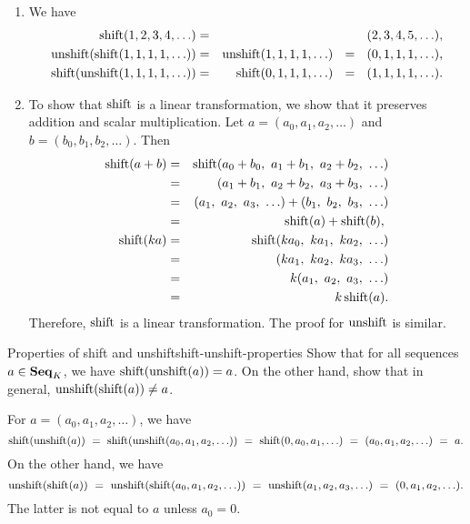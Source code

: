 \begin{solution}
  \begin{enumialphparenastyle}
    \begin{enumerate}
    \item We have
      \begin{eqnarray*}
        \shift(1,2,3,4,\ldots)
        &=& (2,3,4,5,\ldots), \\
        \unshift(\shift(1,1,1,1,\ldots))
        &=& \unshift(1,1,1,1,\ldots)
        ~~=~~ (0,1,1,1,\ldots), \\
        \shift(\unshift(1,1,1,1,\ldots))
        &=& \shift(0,1,1,1,\ldots)
        ~~=~~ (1,1,1,1,\ldots).
      \end{eqnarray*}
    \item To show that $\shift$ is a linear transformation, we show
      that it preserves addition and scalar multiplication. Let
      $a=(a_0,a_1,a_2,\ldots)$ and $b=(b_0,b_1,b_2,\ldots)$. Then
      \begin{eqnarray*}
        \shift(a+b) &=& \shift(a_0+b_0,~a_1+b_1,~a_2+b_2,~\ldots) \\
                    &=& (a_1+b_1,~a_2+b_2,~a_3+b_3,~\ldots) \\
                    &=& (a_1,~a_2,~a_3,~\ldots) + (b_1,~b_2,~b_3,~\ldots) \\
                    &=& \shift(a) + \shift(b),~ \\
        \shift(ka)  &=& \shift(ka_0,~ka_1,~ka_2,~\ldots) \\
                    &=& (ka_1,~ka_2,~ka_3,~\ldots) \\
                    &=& k(a_1,~a_2,~a_3,~\ldots) \\
                    &=& k\shift(a).
      \end{eqnarray*}
      Therefore, $\shift$ is a linear transformation. The proof for
      $\unshift$ is similar.
    \end{enumerate}
  \end{enumialphparenastyle}
\end{solution}

\begin{example}{Properties of shift and unshift}{shift-unshift-properties}
  Show that for all sequences $a\in\mathbf{Seq}_K$, we have
  $\shift(\unshift(a))=a$. On the other hand, show that in general,
  $\unshift(\shift(a))\neq a$.
\end{example}

\begin{solution}
  For $a=(a_0,a_1,a_2,\ldots)$, we have
  \begin{equation*}
    \shift(\unshift(a))
    ~=~ \shift(\unshift(a_0,a_1,a_2,\ldots))
    ~=~ \shift(0,a_0,a_1,\ldots)
    ~=~ (a_0,a_1,a_2,\ldots)
    ~=~ a.
  \end{equation*}
  On the other hand, we have
  \begin{equation*}
    \unshift(\shift(a))
    ~=~ \unshift(\shift(a_0,a_1,a_2,\ldots))
    ~=~ \unshift(a_1,a_2,a_3,\ldots)
    ~=~ (0,a_1,a_2,\ldots).
  \end{equation*}
  The latter is not equal to $a$ unless $a_0=0$.
\end{solution}

